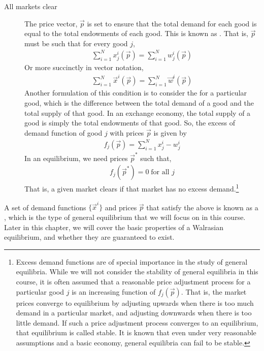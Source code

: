 \begin{description}
    \item[All markets clear] The price vector, $\vec{p}$ is set to ensure that the total demand for each good is equal to the total endowments of each good. This is known as . That is, $\vec{p}$ must be such that for every good $j$, 
    \begin{align*}
        \sum_{i = 1}^N x^i_j(\vec{p}) = \sum_{i = 1}^N w^i_j(\vec{p})
    \end{align*}  
    Or more succinctly in vector notation,
    \begin{align*}
        \sum_{i = 1}^N \vec{x}^i(\vec{p}) = \sum_{i = 1}^N \vec{w}^i(\vec{p})
    \end{align*}
    Another formulation of this condition is to consider the  for a particular good, which is the difference between the total demand of a good and the total supply of that good. In an exchange economy, the total supply of a good is simply the total endowments of that good. So, the excess of demand function of good $j$ with prices $\vec{p}$ is given by
    \begin{align*}
        f_j(\vec{p}) = \sum_{i = 1}^N x^i_j - w^i_j
    \end{align*}
    In an equilibrium, we need prices $\vec{p}^*$ such that,
    \begin{align*}
        f_j(\vec{p}^*) = 0 \; \text{for all $j$}
    \end{align*}
    That is, a given market clears if that market has no excess demand.\footnote{
        Excess demand functions are of special importance in the study of general equilibria. While we will not consider the stability of general equilibria in this course, it is often assumed that a reasonable price adjustment process for a particular good $j$ is an increasing function of $f_j(\vec{p})$. That is, the market prices converge to equilibrium by adjusting upwards when there is too much demand in a particular market, and adjusting downwards when there is too little demand. If such a price adjustment process converges to an equilibrium, that equilibrium is called stable. It is known that even under very reasonable assumptions and a basic economy, general equilibria can fail to be stable. 
    }
\end{description}
A set of demand functions $\{\vec{x}^i\}$ and prices $\vec{p}$ that satisfy the above is known as a , which is the type of general equilibrium that we will focus on in this course. Later in this chapter, we will cover the basic properties of a Walrasian equilibrium, and whether they are guaranteed to exist. 